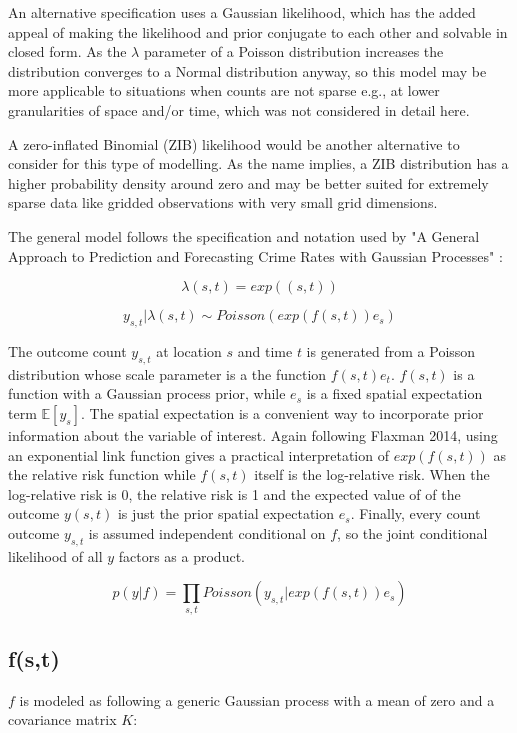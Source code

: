 An alternative specification uses a Gaussian likelihood, which has the added appeal of making the likelihood and prior conjugate to each other and solvable in closed form. As the $\lambda$ parameter of a Poisson distribution increases the distribution converges to a Normal distribution anyway, so this model may be more applicable to situations when counts are not sparse e.g., at lower granularities of space and/or time, which was not considered in detail here.

A zero-inflated Binomial (ZIB) likelihood would be another alternative to consider for this type of modelling. As the name implies, a ZIB distribution has a higher probability density around zero and may be better suited for extremely sparse data like gridded observations with very small grid dimensions.

 The general model follows the specification and notation used by "A General Approach to Prediction and Forecasting Crime Rates with Gaussian Processes" \cite{flaxman_2014}: \par


$$\lambda(s,t) = exp((s,t))$$

$$ y_{s,t} | \lambda(s,t) \sim Poisson(exp(f(s,t))e_s) $$

The outcome count $y_{s,t}$ at location $s$ and time $t$ is generated from a Poisson distribution whose scale parameter is a the function $f(s,t)e_t$. $f(s,t)$ is a function with a Gaussian process prior, while $e_s$ is a fixed spatial expectation term $\mathbb{E}[y_s]$. The spatial expectation is a convenient way to incorporate prior information about the variable of interest. Again following Flaxman 2014, using an exponential link function gives a practical interpretation of $exp(f(s,t))$ as the relative risk function while $f(s,t)$ itself is the log-relative risk. When the log-relative risk is 0, the relative risk is 1 and the expected value of of the outcome $y(s,t)$ is just the prior spatial expectation $e_s$. Finally, every count outcome $y_{s,t}$ is assumed independent conditional on $f$, so the joint conditional likelihood of all $y$ factors as a product.

$$p(y|f) = \prod_{s,t}{ Poisson( y_{s,t}| exp(f(s,t))e_s)}$$

\subsection{f(s,t)}

$f$ is modeled as following a generic Gaussian process with a mean of zero and a covariance matrix $K$:

